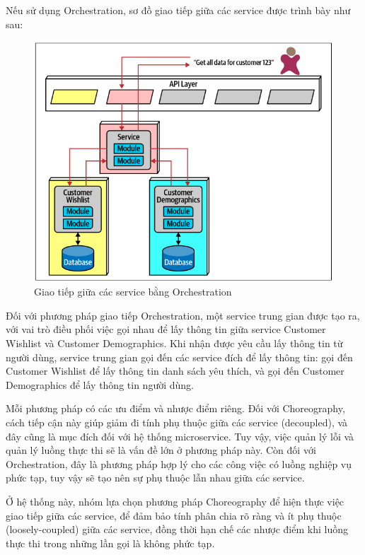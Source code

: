 \par Nếu sử dụng Orchestration, sơ đồ giao tiếp giữa các service được trình bày như sau:
\begin{figure}[!htp]
	\centering
	\includegraphics[width=17cm]{img/Architecture/orchestration.PNG}
	\newline
	\caption{Giao tiếp giữa các service bằng Orchestration \cite{archOrchestration}}
\end{figure}
Đối với phương pháp giao tiếp Orchestration, một service trung gian được tạo ra, với vai trò điều phối việc gọi nhau để lấy thông tin giữa service Customer Wishlist và Customer Demographics. Khi nhận được yêu cầu lấy thông tin từ người dùng, service trung gian gọi đến các service đích để lấy thông tin: gọi đến Customer Wishlist để lấy thông tin danh sách yêu thích, và gọi đến Customer Demographics để lấy thông tin người dùng.

\par Mỗi phương pháp có các ưu điểm và nhược điểm riêng. Đối với Choreography, cách tiếp cận này giúp giảm đi tính phụ thuộc giữa các service (decoupled), và đây cũng là mục đích đối với hệ thống microservice. Tuy vậy, việc quản lý lỗi và quản lý luồng thực thi sẽ là vấn đề lớn ở phương pháp này. Còn đối với Orchestration, đây là phương pháp hợp lý cho các công việc có luồng nghiệp vụ phức tạp, tuy vậy sẽ tạo nên sự phụ thuộc lẫn nhau giữa các service.

\par Ở hệ thống này, nhóm lựa chọn phương pháp Choreography để hiện thực việc giao tiếp giữa các service, để đảm bảo tính phân chia rõ ràng và ít phụ thuộc (loosely-coupled) giữa các service, đồng thời hạn chế các nhược điểm khi luồng thực thi trong những lần gọi là không phức tạp.

